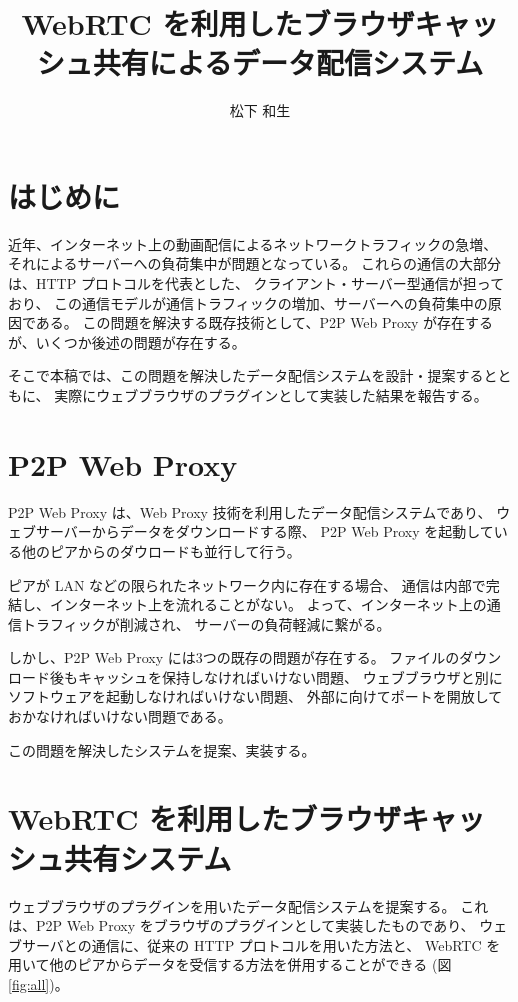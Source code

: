 \documentclass[a4j]{jarticle}
\title{WebRTC を利用したブラウザキャッシュ共有によるデータ配信システム}
\author{松下 和生}
\begin{document}
\begin{Abstract}

  \section{はじめに}
  近年、インターネット上の動画配信によるネットワークトラフィックの急増、
  それによるサーバーへの負荷集中が問題となっている。
  これらの通信の大部分は、HTTP プロトコルを代表とした、 クライアント・サーバー型通信が担っており、
  この通信モデルが通信トラフィックの増加、サーバーへの負荷集中の原因である。
  この問題を解決する既存技術として、P2P Web Proxy が存在するが、いくつか後述の問題が存在する。

  そこで本稿では、この問題を解決したデータ配信システムを設計・提案するとともに、 
  実際にウェブブラウザのプラグインとして実装した結果を報告する。
  
  
  \section{P2P Web Proxy}
  P2P Web Proxy は、Web Proxy 技術を利用したデータ配信システムであり、
  ウェブサーバーからデータをダウンロードする際、
  P2P Web Proxy を起動している他のピアからのダウロードも並行して行う。

  ピアが LAN などの限られたネットワーク内に存在する場合、
  通信は内部で完結し、インターネット上を流れることがない。
  よって、インターネット上の通信トラフィックが削減され、
  サーバーの負荷軽減に繋がる。

  しかし、P2P Web Proxy には3つの既存の問題が存在する。
  ファイルのダウンロード後もキャッシュを保持しなければいけない問題、
  ウェブブラウザと別にソフトウェアを起動しなければいけない問題、
  外部に向けてポートを開放しておかなければいけない問題である。
  
  この問題を解決したシステムを提案、実装する。
  
  
  \section{WebRTC を利用したブラウザキャッシュ共有システム}
  ウェブブラウザのプラグインを用いたデータ配信システムを提案する。
  これは、P2P Web Proxy をブラウザのプラグインとして実装したものであり、
  ウェブサーバとの通信に、従来の HTTP プロトコルを用いた方法と、
  WebRTC を用いて他のピアからデータを受信する方法を併用することができる (図 \ref{fig:all})。
  

\end{Abstract}
\end{document}
